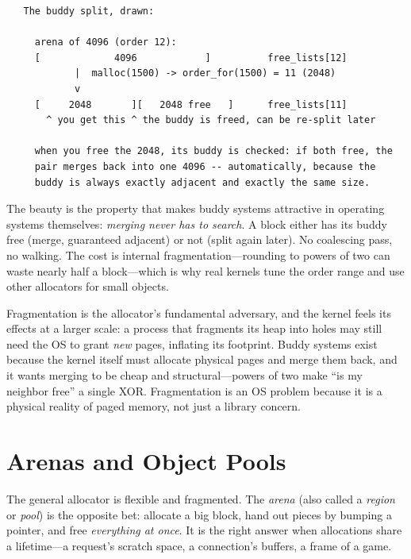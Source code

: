\begin{verbatim}
   The buddy split, drawn:

     arena of 4096 (order 12):
     [             4096            ]          free_lists[12]
            |  malloc(1500) -> order_for(1500) = 11 (2048)
            v
     [     2048       ][   2048 free   ]      free_lists[11]
       ^ you get this ^ the buddy is freed, can be re-split later

     when you free the 2048, its buddy is checked: if both free, the
     pair merges back into one 4096 -- automatically, because the
     buddy is always exactly adjacent and exactly the same size.
\end{verbatim}

The beauty is the property that makes buddy systems attractive in
operating systems themselves: \emph{merging never has to search}. A
block either has its buddy free (merge, guaranteed adjacent) or not
(split again later). No coalescing pass, no walking. The cost is
internal fragmentation---rounding to powers of two can waste nearly
half a block---which is why real kernels tune the order range and use
other allocators for small objects.

\begin{osconcept}
Fragmentation is the allocator's fundamental adversary, and the kernel
feels its effects at a larger scale: a process that fragments its heap
into holes may still need the OS to grant \emph{new} pages, inflating
its footprint. Buddy systems exist because the kernel itself must
allocate physical pages and merge them back, and it wants merging to
be cheap and structural---powers of two make ``is my neighbor free''
a single XOR. Fragmentation is an OS problem because it is a physical
reality of paged memory, not just a library concern.
\end{osconcept}

\section{Arenas and Object Pools}

The general allocator is flexible and fragmented. The \emph{arena}
(also called a \emph{region} or \emph{pool}) is the opposite bet:
allocate a big block, hand out pieces by bumping a pointer, and free
\emph{everything at once}. It is the right answer when allocations
share a lifetime---a request's scratch space, a connection's
buffers, a frame of a game.

